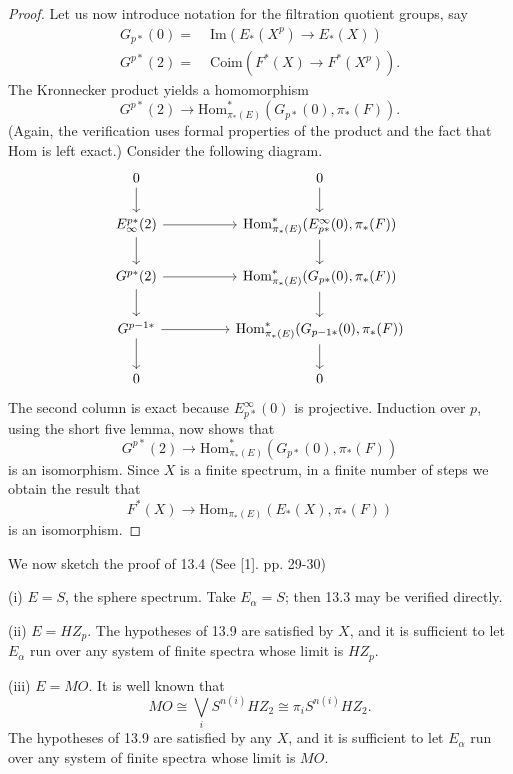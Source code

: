 \documentclass[../main]{subfiles}
\begin{document}
\begin{proof}
Let us now introduce notation for the filtration quotient groups, say
\begin{align*}
G_{p \ast}(0) =&\; \text{Im}(E_{\ast}(X^p) \longrightarrow E_{\ast}(X)) \\
G^{p \ast}(2) =&\; \text{Coim}(F^{\ast}(X) \longrightarrow F^{\ast}(X^p)).
\end{align*}
The Kronnecker product yields a homomorphism
\[G^{p \ast}(2) \longrightarrow \text{Hom}^{\ast}_{\pi_\ast(E)}(G_{p \ast}(0), \pi_\ast(F)).\]
(Again, the verification uses formal properties of the product and the fact that Hom is left exact.) Consider the following diagram.
\[\begin{tikzcd}
	0 && 0 \\
	{E_{\infty}^{p\ast}(2)} && {\text{Hom}^{\ast}_{\pi_\ast(E)}(E^\infty_{p\ast}(0), \pi_\ast(F))} \\
	{G^{p\ast}(2)} && {\text{Hom}^{\ast}_{\pi_\ast(E)}(G_{p\ast}(0), \pi_\ast(F))} \\
	{G^{p-1\ast}} && {\text{Hom}^{\ast}_{\pi_\ast(E)}(G_{p-1\ast}(0), \pi_\ast(F))} \\
	0 && 0
	\arrow[from=1-1, to=2-1]
	\arrow[from=2-1, to=3-1]
	\arrow[from=3-1, to=4-1]
	\arrow[from=4-1, to=5-1]
	\arrow[from=1-3, to=2-3]
	\arrow[from=2-3, to=3-3]
	\arrow[from=3-3, to=4-3]
	\arrow[from=4-3, to=5-3]
	\arrow[from=2-1, to=2-3]
	\arrow[from=3-1, to=3-3]
	\arrow[from=4-1, to=4-3]
\end{tikzcd}\]
The second column is exact because $E^{\infty}_{p\ast}(0)$ is projective. Induction over $p$, using the short five lemma, now shows that 
\[G^{p\ast}(2)\longrightarrow \text{Hom}^{\ast}_{\pi_\ast(E)}(G_{p\ast}(0), \pi_\ast(F))\]
is an isomorphism. Since $X$ is a finite spectrum, in a finite number of steps we obtain the result that
\[F^\ast(X)\longrightarrow \text{Hom}_{\pi_\ast(E)}(E_\ast(X), \pi_\ast(F))\]
is an isomorphism.
\end{proof}
We now sketch the proof of 13.4 (See [1]. pp. 29-30)

(i) $E=S$, the sphere spectrum. Take $E_\alpha = S$; then 13.3 may be verified directly.

(ii) $E=HZ_p$. The hypotheses of 13.9 are satisfied by $X$, and it is sufficient to let $E_\alpha$ run over any system of finite spectra whose limit is $HZ_p$.

(iii) $E=MO$. It is well known that
\[MO \cong \bigvee_{i} S^{n(i)}HZ_2 \cong \pi_i S^{n(i)} HZ_2.\]
The hypotheses of 13.9 are satisfied by any $X$, and it is sufficient to let $E_\alpha$ run over any system of finite spectra whose limit is $MO$.
\end{document}
